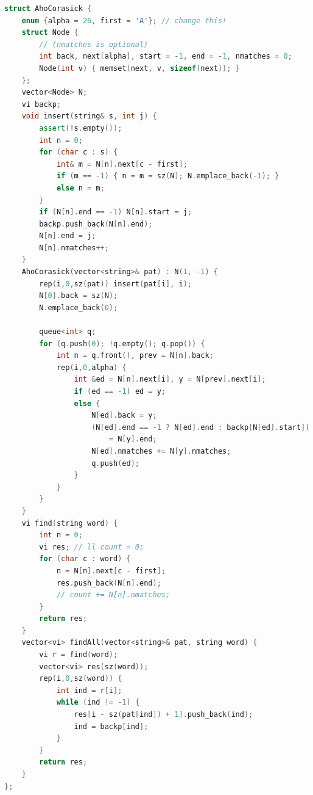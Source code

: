 \begin{multicols}{\Columns}
\begin{lstlisting}[language=C++]
struct AhoCorasick {
	enum {alpha = 26, first = 'A'}; // change this!
	struct Node {
		// (nmatches is optional)
		int back, next[alpha], start = -1, end = -1, nmatches = 0;
		Node(int v) { memset(next, v, sizeof(next)); }
	};
	vector<Node> N;
	vi backp;
	void insert(string& s, int j) {
		assert(!s.empty());
		int n = 0;
		for (char c : s) {
			int& m = N[n].next[c - first];
			if (m == -1) { n = m = sz(N); N.emplace_back(-1); }
			else n = m;
		}
		if (N[n].end == -1) N[n].start = j;
		backp.push_back(N[n].end);
		N[n].end = j;
		N[n].nmatches++;
	}
	AhoCorasick(vector<string>& pat) : N(1, -1) {
		rep(i,0,sz(pat)) insert(pat[i], i);
		N[0].back = sz(N);
		N.emplace_back(0);

		queue<int> q;
		for (q.push(0); !q.empty(); q.pop()) {
			int n = q.front(), prev = N[n].back;
			rep(i,0,alpha) {
				int &ed = N[n].next[i], y = N[prev].next[i];
				if (ed == -1) ed = y;
				else {
					N[ed].back = y;
					(N[ed].end == -1 ? N[ed].end : backp[N[ed].start])
						= N[y].end;
					N[ed].nmatches += N[y].nmatches;
					q.push(ed);
				}
			}
		}
	}
	vi find(string word) {
		int n = 0;
		vi res; // ll count = 0;
		for (char c : word) {
			n = N[n].next[c - first];
			res.push_back(N[n].end);
			// count += N[n].nmatches;
		}
		return res;
	}
	vector<vi> findAll(vector<string>& pat, string word) {
		vi r = find(word);
		vector<vi> res(sz(word));
		rep(i,0,sz(word)) {
			int ind = r[i];
			while (ind != -1) {
				res[i - sz(pat[ind]) + 1].push_back(ind);
				ind = backp[ind];
			}
		}
		return res;
	}
};
\end{lstlisting}



\end{multicols}
